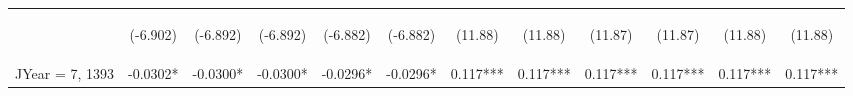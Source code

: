 \documentclass[]{article}
\begin{document}
\begin{center}
\begin{tabular}{lccccccccccc}
        \vspace{4pt}     & \begin{footnotesize}(-6.902)\end{footnotesize} & \begin{footnotesize}(-6.892)\end{footnotesize} & \begin{footnotesize}(-6.892)\end{footnotesize} & \begin{footnotesize}(-6.882)\end{footnotesize} & \begin{footnotesize}(-6.882)\end{footnotesize} & \begin{footnotesize}(11.88)\end{footnotesize}   & \begin{footnotesize}(11.88)\end{footnotesize}   & \begin{footnotesize}(11.87)\end{footnotesize}  & \begin{footnotesize}(11.87)\end{footnotesize}  & \begin{footnotesize}(11.88)\end{footnotesize}  & \begin{footnotesize}(11.88)\end{footnotesize}  \\
        JYear = 7, 1393  & -0.0302*                                       & -0.0300*                                       & -0.0300*                                       & -0.0296*                                       & -0.0296*                                       & 0.117***                                        & 0.117***                                        & 0.117***                                       & 0.117***                                       & 0.117***                                       & 0.117***                                       \\

\end{tabular}
\end{center}
\end{document}
